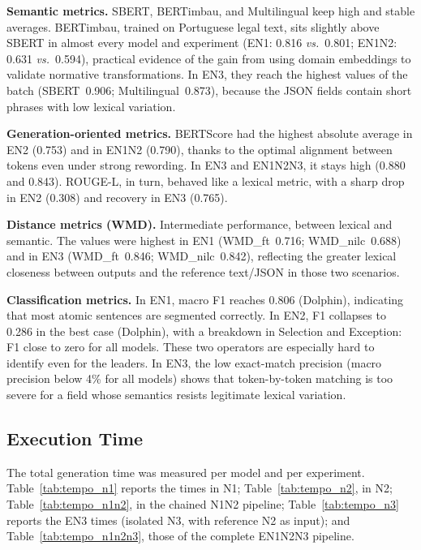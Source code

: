 \documentclass[a4paper,fleqn]{cas-sc}
\begin{document}
\textbf{Semantic metrics.} SBERT, BERTimbau, and Multilingual keep high and stable averages. BERTimbau, trained on Portuguese legal text, sits slightly above SBERT in almost every model and experiment (EN1: 0.816 \textit{vs.}~0.801; EN1N2: 0.631 \textit{vs.}~0.594), practical evidence of the gain from using domain embeddings to validate normative transformations. In EN3, they reach the highest values of the batch (SBERT~0.906; Multilingual~0.873), because the JSON fields contain short phrases with low lexical variation.

\textbf{Generation-oriented metrics.} BERTScore had the highest absolute average in EN2 (0.753) and in EN1N2 (0.790), thanks to the optimal alignment between tokens even under strong rewording. In EN3 and EN1N2N3, it stays high (0.880 and 0.843). ROUGE-L, in turn, behaved like a lexical metric, with a sharp drop in EN2 (0.308) and recovery in EN3 (0.765).

\textbf{Distance metrics (WMD).} Intermediate performance, between lexical and semantic. The values were highest in EN1 (WMD\_ft~0.716; WMD\_nilc~0.688) and in EN3 (WMD\_ft~0.846; WMD\_nilc~0.842), reflecting the greater lexical closeness between outputs and the reference text/JSON in those two scenarios.

\textbf{Classification metrics.} In EN1, macro F1 reaches 0.806 (Dolphin), indicating that most atomic sentences are segmented correctly. In EN2, F1 collapses to 0.286 in the best case (Dolphin), with a breakdown in Selection and Exception: F1 close to zero for all models. These two operators are especially hard to identify even for the leaders. In EN3, the low exact-match precision (macro precision below 4\% for all models) shows that token-by-token matching is too severe for a field whose semantics resists legitimate lexical variation.

\subsection{Execution Time}
\label{sec:tempo}

The total generation time was measured per model and per experiment. Table~\ref{tab:tempo_n1} reports the times in N1; Table~\ref{tab:tempo_n2}, in N2; Table~\ref{tab:tempo_n1n2}, in the chained N1N2 pipeline; Table~\ref{tab:tempo_n3} reports the EN3 times (isolated N3, with reference N2 as input); and Table~\ref{tab:tempo_n1n2n3}, those of the complete EN1N2N3 pipeline.
\end{document}
